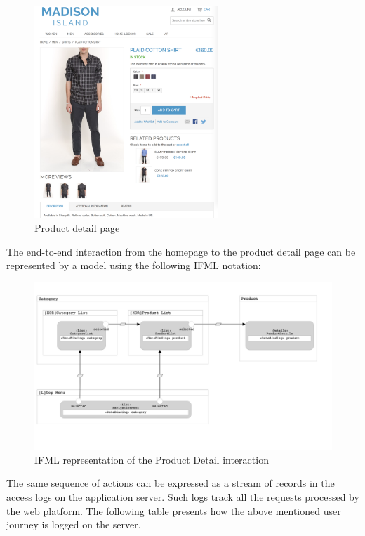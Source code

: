 \vspace{0.5cm}
\begin{figure}[H]
  \centering
    \includegraphics[height=8cm]{images/madison/product-detail.png}
  \caption{Product detail page}
  \label{fig:product-detail}
\end{figure}
\vspace{0.5cm}

The end-to-end interaction from the homepage to the product detail page can be represented by a model using the following IFML notation:

\vspace{0.5cm}
\begin{figure}[H]
  \centering
    \includegraphics[width=12cm]{images/madison/ifml1.png}
  \caption{IFML representation of the Product Detail interaction}
  \label{fig:ifml1}
\end{figure}
\vspace{0.5cm}

The same sequence of actions can be expressed as a stream of records in the access logs on the application server. Such logs track all the requests processed by the web platform. The following table presents how the above mentioned user journey is logged on the server.

